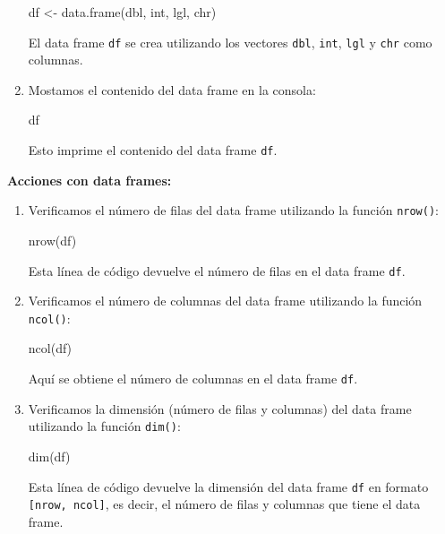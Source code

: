 \documentclass[
  letterpaper,
  DIV=11,
  numbers=noendperiod]{scrartcl}
\newenvironment{Shaded}{}{}
\newcommand{\FunctionTok}[1]{\textcolor[rgb]{0.44,0.26,0.76}{#1}}
\newcommand{\NormalTok}[1]{\textcolor[rgb]{0.14,0.16,0.18}{#1}}
\newcommand{\OtherTok}[1]{\textcolor[rgb]{0.44,0.26,0.76}{#1}}
\begin{document}
\begin{enumerate}
\begin{Shaded}
\begin{Highlighting}[]
\NormalTok{df }\OtherTok{\textless{}{-}} \FunctionTok{data.frame}\NormalTok{(dbl, int, lgl, chr)}
\end{Highlighting}
\end{Shaded}

  El data frame \texttt{df} se crea utilizando los vectores
  \texttt{dbl}, \texttt{int}, \texttt{lgl} y \texttt{chr} como columnas.
\item
  Mostamos el contenido del data frame en la consola:

\begin{Shaded}
\begin{Highlighting}[]
\NormalTok{df}
\end{Highlighting}
\end{Shaded}

  Esto imprime el contenido del data frame \texttt{df}.
\end{enumerate}

\textbf{Acciones con data frames:}

\begin{enumerate}
\def\labelenumi{\arabic{enumi}.}
\item
  Verificamos el número de filas del data frame utilizando la función
  \texttt{nrow()}:

\begin{Shaded}
\begin{Highlighting}[]
\FunctionTok{nrow}\NormalTok{(df)}
\end{Highlighting}
\end{Shaded}

  Esta línea de código devuelve el número de filas en el data frame
  \texttt{df}.
\item
  Verificamos el número de columnas del data frame utilizando la función
  \texttt{ncol()}:

\begin{Shaded}
\begin{Highlighting}[]
\FunctionTok{ncol}\NormalTok{(df)}
\end{Highlighting}
\end{Shaded}

  Aquí se obtiene el número de columnas en el data frame \texttt{df}.
\item
  Verificamos la dimensión (número de filas y columnas) del data frame
  utilizando la función \texttt{dim()}:

\begin{Shaded}
\begin{Highlighting}[]
\FunctionTok{dim}\NormalTok{(df)}
\end{Highlighting}
\end{Shaded}

  Esta línea de código devuelve la dimensión del data frame \texttt{df}
  en formato \texttt{{[}nrow,\ ncol{]}}, es decir, el número de filas y
  columnas que tiene el data frame.
\end{enumerate}
\end{document}
